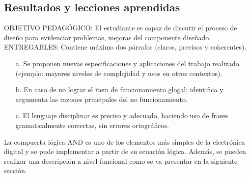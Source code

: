 \subsection{Resultados y lecciones aprendidas}
\scriptsize
	\begin{tcolorbox}[enhanced,title=PRODUCTO DE CALIDAD:,colframe=colorA1,colback=colorA2,arc=0mm,colbacktitle=white,fonttitle=\bfseries,coltitle=white,attach boxed title to top left={xshift=3.2mm,yshift=-0.50mm},boxed title style={skin=enhancedfirst jigsaw,size=small,arc=0mm,bottom=1mm,interior style={fill=none,top color=color2,bottom color=color2},,boxrule=0pt},boxrule=0pt]
		OBJETIVO PEDAGÓGICO: El estudiante es capaz de discutir el proceso de diseño para evidenciar problemas, mejoras del componente diseñado.\\
		ENTREGABLES: Contiene máximo dos párrafos (claros, precisos y coherentes).
		\begin{enumerate}
			\item[a.] Se proponen nuevas especificaciones y aplicaciones del trabajo realizado (ejemplo: mayores niveles de complejidad y usos en otros contextos).
			\item[b.] En caso de no lograr el item de funcionamiento glogal; identifica y argumenta las razones principales del no funcionamiento. 
			\item[c.] El lenguaje disciplinar es preciso y adecuado, haciendo uso de frases gramaticalmente correctas, sin errores ortográficos.
		\end{enumerate}
	\end{tcolorbox}

\normalsize

	\begin{tcolorbox}[colback=colorT2,colframe=colorT1,arc=0mm,boxrule=0pt,title=]
		La compuerta lógica AND es uno de los elementos más simples de la electrónica digital y se pude implementar a partir de su ecuación lógica. Además, se pueden realizar una descripción a nivel funcional como se va presentar en la siguiente sección. \\
	\end{tcolorbox}
